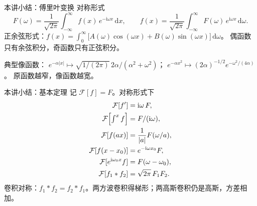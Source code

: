\documentclass[fontset=windows, chinese, 10pt, xcolor=dvipsnames]{beamer}
\begin{document}


\begin{frame}{本讲小结：傅里叶变换}
  对称形式
  \begin{equation*}
    F(\omega)=\frac{1}{\sqrt{2\pi}}\int_{-\infty}^{\infty}
      f(x)\,e^{-\mathrm{i}\omega x}\,\mathrm{d}x,
    \qquad
    f(x)=\frac{1}{\sqrt{2\pi}}\int_{-\infty}^{\infty}
      F(\omega)\,e^{\mathrm{i}\omega x}\,\mathrm{d}\omega.
  \end{equation*}
  正余弦形式：$f(x)=\displaystyle\int_0^{\infty}
  \bigl[A(\omega)\cos(\omega x)+B(\omega)\sin(\omega x)\bigr]\,\mathrm{d}\omega$。
  偶函数只有余弦积分，奇函数只有正弦积分。
  \vspace{0.25em}

  典型像函数：
  $e^{-\alpha|x|}\mapsto\sqrt{1/(2\pi)}\,2\alpha/(\alpha^2+\omega^2)$；
  $e^{-\alpha x^2}\mapsto(2\alpha)^{-1/2}e^{-\omega^2/(4\alpha)}$。
  原函数越窄，像函数越宽。
\end{frame}

\begin{frame}{本讲小结：基本定理}
  记 $\mathcal{F}[f]=F$。对称形式下
  \begin{align*}
    \mathcal{F}[f']&=\mathrm{i}\omega\,F,\\
    \mathcal{F}\Bigl[\textstyle\int^{x}f\Bigr]
      &=F/(\mathrm{i}\omega),\\
    \mathcal{F}[f(ax)]
      &=\frac{1}{|a|}F(\omega/a),\\
    \mathcal{F}[f(x-x_0)]
      &=e^{-\mathrm{i}\omega x_0}F,\\
    \mathcal{F}[e^{\mathrm{i}\omega_0 x}f]
      &=F(\omega-\omega_0),\\
    \mathcal{F}[f_1*f_2]
      &=\sqrt{2\pi}\,F_1 F_2.
  \end{align*}
  卷积对称：$f_1*f_2=f_2*f_1$。两方波卷积得梯形；两高斯卷积仍是高斯，方差相加。
\end{frame}
\end{document}
